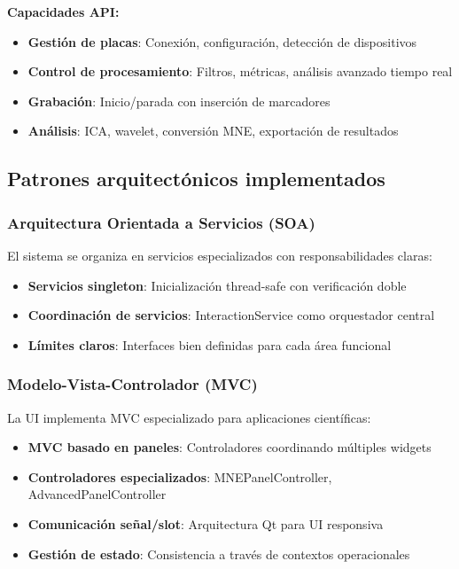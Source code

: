 \textbf{Capacidades API:}
\begin{itemize}
    \item \textbf{Gestión de placas}: Conexión, configuración, detección de dispositivos
    \item \textbf{Control de procesamiento}: Filtros, métricas, análisis avanzado tiempo real
    \item \textbf{Grabación}: Inicio/parada con inserción de marcadores
    \item \textbf{Análisis}: ICA, wavelet, conversión MNE, exportación de resultados
\end{itemize}

\subsection{Patrones arquitectónicos implementados}
\label{subsec:patrones_eeg_processor}

\subsubsection{Arquitectura Orientada a Servicios (SOA)}
El sistema se organiza en servicios especializados con responsabilidades claras:
\begin{itemize}
    \item \textbf{Servicios singleton}: Inicialización thread-safe con verificación doble
    \item \textbf{Coordinación de servicios}: InteractionService como orquestador central
    \item \textbf{Límites claros}: Interfaces bien definidas para cada área funcional
\end{itemize}

\subsubsection{Modelo-Vista-Controlador (MVC)}
La UI implementa MVC especializado para aplicaciones científicas:
\begin{itemize}
    \item \textbf{MVC basado en paneles}: Controladores coordinando múltiples widgets
    \item \textbf{Controladores especializados}: MNEPanelController, AdvancedPanelController
    \item \textbf{Comunicación señal/slot}: Arquitectura Qt para UI responsiva
    \item \textbf{Gestión de estado}: Consistencia a través de contextos operacionales
\end{itemize}

